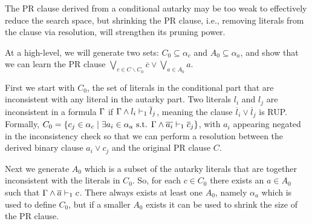 The PR clause derived from a conditional autarky may be too weak to effectively reduce the search space, 
but shrinking the PR clause, i.e., removing literals from the clause via resolution, will strengthen its pruning power. 

At a high-level, we will generate two sets: $C_0 \subseteq \alpha_c$ and $A_0 \subseteq \alpha_a$, 
and show that we can learn the PR clause $\bigvee_{c \in C \backslash C_0} \overline{c} \lor
\bigvee_{a \in A_0} a$. 

First we start with $C_0$, the set of literals in the conditional part that are inconsistent with any literal in the autarky part.
Two literals $l_i$ and $l_j$ are inconsistent in a formula $\Gamma$ if  $\Gamma \land l_i \vdash_1 \overline{l}_j$, meaning the clause $\overline{l}_i \lor \overline{l}_j$ is RUP. 
Formally, $C_0 = \{c_j \in \alpha_c \mid \exists a_i \in
\alpha_a \text{ s.t. } \Gamma \land \overline{a_i} \vdash_1 \overline{c}_j \}$, with $a_i$ appearing negated in the inconsistency check so that we can perform a resolution between the derived binary clause  $a_i \lor c_j$ and the original PR clause $C$.

Next we generate $A_0$ which is a subset of the autarky literals that are together inconsistent with the literals in $C_0$. 
So, for each $c \in C_0$ there exists an $a \in A_0$ such that $\Gamma \land \overline{a} \vdash_1 c$. 
There always exists at least one $A_0$, namely $\alpha_a$ which is used to define $C_0$, 
but if a smaller $A_0$ exists it can be used to shrink the size of the PR clause. 


